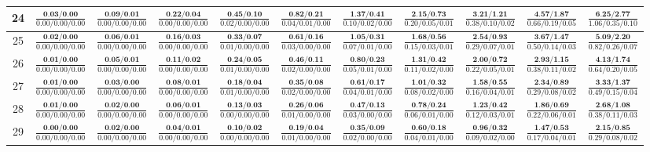 \documentclass{slides}
\begin{document}
{{{\begin{tabular}{|c|c|c|c|c|c|c|c|c|c|c|}
\hline
24 & $\frac{\textbf{0.03/0.00}}{0.00/0.00/0.00}$ & $\frac{\textbf{0.09/0.01}}{0.00/0.00/0.00}$ & $\frac{\textbf{0.22/0.04}}{0.00/0.00/0.00}$ & $\frac{\textbf{0.45/0.10}}{0.02/0.00/0.00}$ & $\frac{\textbf{0.82/0.21}}{0.04/0.01/0.00}$ & $\frac{\textbf{1.37/0.41}}{0.10/0.02/0.00}$ & $\frac{\textbf{2.15/0.73}}{0.20/0.05/0.01}$ & $\frac{\textbf{3.21/1.21}}{0.38/0.10/0.02}$ & $\frac{\textbf{4.57/1.87}}{0.66/0.19/0.05}$ & $\frac{\textbf{6.25/2.77}}{1.06/0.35/0.10}$ \\
\hline
25 & $\frac{\textbf{0.02/0.00}}{0.00/0.00/0.00}$ & $\frac{\textbf{0.06/0.01}}{0.00/0.00/0.00}$ & $\frac{\textbf{0.16/0.03}}{0.00/0.00/0.00}$ & $\frac{\textbf{0.33/0.07}}{0.01/0.00/0.00}$ & $\frac{\textbf{0.61/0.16}}{0.03/0.00/0.00}$ & $\frac{\textbf{1.05/0.31}}{0.07/0.01/0.00}$ & $\frac{\textbf{1.68/0.56}}{0.15/0.03/0.01}$ & $\frac{\textbf{2.54/0.93}}{0.29/0.07/0.01}$ & $\frac{\textbf{3.67/1.47}}{0.50/0.14/0.03}$ & $\frac{\textbf{5.09/2.20}}{0.82/0.26/0.07}$ \\
\hline
26 & $\frac{\textbf{0.01/0.00}}{0.00/0.00/0.00}$ & $\frac{\textbf{0.05/0.01}}{0.00/0.00/0.00}$ & $\frac{\textbf{0.11/0.02}}{0.00/0.00/0.00}$ & $\frac{\textbf{0.24/0.05}}{0.01/0.00/0.00}$ & $\frac{\textbf{0.46/0.11}}{0.02/0.00/0.00}$ & $\frac{\textbf{0.80/0.23}}{0.05/0.01/0.00}$ & $\frac{\textbf{1.31/0.42}}{0.11/0.02/0.00}$ & $\frac{\textbf{2.00/0.72}}{0.22/0.05/0.01}$ & $\frac{\textbf{2.93/1.15}}{0.38/0.11/0.02}$ & $\frac{\textbf{4.13/1.74}}{0.64/0.20/0.05}$ \\
\hline
27 & $\frac{\textbf{0.01/0.00}}{0.00/0.00/0.00}$ & $\frac{\textbf{0.03/0.00}}{0.00/0.00/0.00}$ & $\frac{\textbf{0.08/0.01}}{0.00/0.00/0.00}$ & $\frac{\textbf{0.18/0.04}}{0.01/0.00/0.00}$ & $\frac{\textbf{0.35/0.08}}{0.02/0.00/0.00}$ & $\frac{\textbf{0.61/0.17}}{0.04/0.01/0.00}$ & $\frac{\textbf{1.01/0.32}}{0.08/0.02/0.00}$ & $\frac{\textbf{1.58/0.55}}{0.16/0.04/0.01}$ & $\frac{\textbf{2.34/0.89}}{0.29/0.08/0.02}$ & $\frac{\textbf{3.33/1.37}}{0.49/0.15/0.04}$ \\
\hline
28 & $\frac{\textbf{0.01/0.00}}{0.00/0.00/0.00}$ & $\frac{\textbf{0.02/0.00}}{0.00/0.00/0.00}$ & $\frac{\textbf{0.06/0.01}}{0.00/0.00/0.00}$ & $\frac{\textbf{0.13/0.03}}{0.00/0.00/0.00}$ & $\frac{\textbf{0.26/0.06}}{0.01/0.00/0.00}$ & $\frac{\textbf{0.47/0.13}}{0.03/0.00/0.00}$ & $\frac{\textbf{0.78/0.24}}{0.06/0.01/0.00}$ & $\frac{\textbf{1.23/0.42}}{0.12/0.03/0.01}$ & $\frac{\textbf{1.86/0.69}}{0.22/0.06/0.01}$ & $\frac{\textbf{2.68/1.08}}{0.38/0.11/0.03}$ \\
\hline
29 & $\frac{\textbf{0.00/0.00}}{0.00/0.00/0.00}$ & $\frac{\textbf{0.02/0.00}}{0.00/0.00/0.00}$ & $\frac{\textbf{0.04/0.01}}{0.00/0.00/0.00}$ & $\frac{\textbf{0.10/0.02}}{0.00/0.00/0.00}$ & $\frac{\textbf{0.19/0.04}}{0.01/0.00/0.00}$ & $\frac{\textbf{0.35/0.09}}{0.02/0.00/0.00}$ & $\frac{\textbf{0.60/0.18}}{0.04/0.01/0.00}$ & $\frac{\textbf{0.96/0.32}}{0.09/0.02/0.00}$ & $\frac{\textbf{1.47/0.53}}{0.17/0.04/0.01}$ & $\frac{\textbf{2.15/0.85}}{0.29/0.08/0.02}$ \\

\end{tabular}}}}
\end{document}
